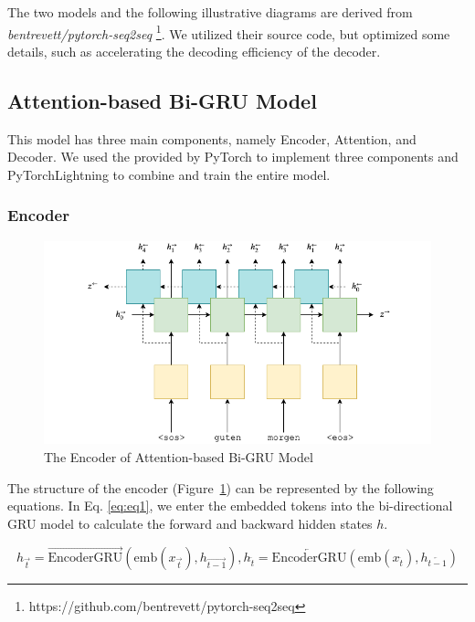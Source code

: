 The two models and the following illustrative diagrams are derived from \textit{bentrevett/pytorch-seq2seq} \footnote{https://github.com/bentrevett/pytorch-seq2seq}. We utilized their source code, but optimized some details, such as accelerating the decoding efficiency of the decoder.

\subsection{Attention-based Bi-GRU Model} \label{sec:rnn}

This model has three main components, namely Encoder, Attention, and Decoder. We used the  provided by PyTorch to implement three components and PyTorchLightning to combine and train the entire model.

\subsubsection{Encoder}

\begin{figure}[H]
	\centering
	\includegraphics[scale=0.7]{../images/bi_encoder.png}
    \caption{The Encoder of Attention-based Bi-GRU Model}
	\label{fig:seq2seq_encoder}
\end{figure}

The structure of the encoder (Figure~\ref{fig:seq2seq_encoder}) can be represented by the following equations. In Eq. \ref{eq:eq1}, we enter the embedded tokens into the bi-directional GRU model to calculate the forward and backward hidden states $h$. 

\begin{equation}
    h_{\overrightarrow{t}} = \overrightarrow{\text{EncoderGRU}}(\text{emb}(x_{\overrightarrow{t}}), h_{\overrightarrow{t-1}}), 
    h_{\overleftarrow{t}} = \overleftarrow{\text{EncoderGRU}}(\text{emb}(x_{\overleftarrow{t}}), h_{\overleftarrow{t-1}})
    \label{eq:eq1}
\end{equation}

